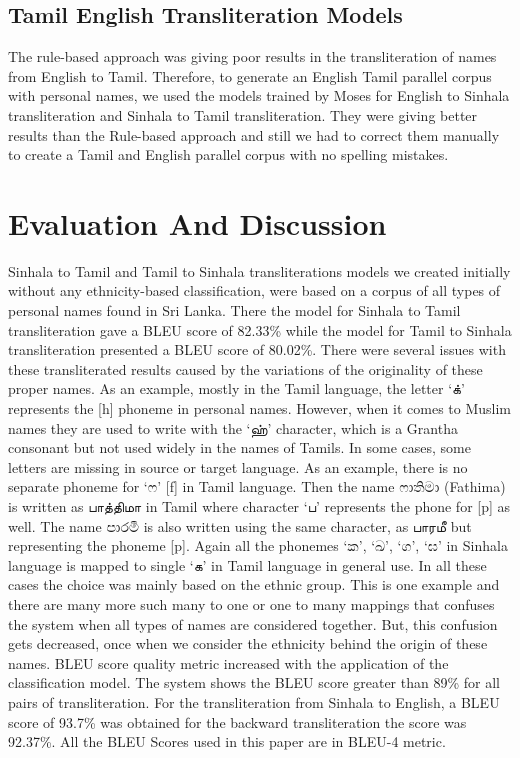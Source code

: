 \documentclass[10pt, a4paper, conference, compsocconf]{IEEEtran}
\begin{document}
\subsection {Tamil English Transliteration Models}
The rule-based approach was giving poor results in the transliteration of names from English to Tamil. Therefore, to generate an English Tamil parallel corpus with personal names, we used the models trained by Moses for English to Sinhala transliteration and Sinhala to Tamil transliteration. They were giving better results than the Rule-based approach and still we had to correct them manually to create a Tamil and English parallel corpus with no spelling mistakes.

\section{Evaluation And Discussion }

 Sinhala to Tamil and Tamil to Sinhala transliterations models we created initially without any ethnicity-based classification, were based on a corpus of all types of personal names found in Sri Lanka. There the model for Sinhala to Tamil transliteration gave a BLEU score of 82.33\% while the model for Tamil to Sinhala transliteration presented a BLEU score of 80.02\%.  
There were several issues with these transliterated results caused by the variations of the originality of these proper names. As an example, mostly in the Tamil language, the letter ‘{\tam க்}’ represents the [h] phoneme in personal names. However, when it comes to Muslim names they are used to write with the ‘{\tam ஹ்}’ character, which is a Grantha consonant  but not used widely in the names of Tamils. In some cases, some letters are missing in source or target language. As an example, there is no separate phoneme for ‘{\sifont ෆ}’ [f] in Tamil language. Then the name {\sifont ෆාතිමා} (Fathima) is written as {\tam பாத்திமா} in Tamil where character ‘{\tam ப}’ represents the phone for [p] as well. The name {\sifont පාරමී } is also written using the same character, as {\tam பாரமீ} but representing the phoneme [p]. Again all the phonemes  ‘{\sifont ක}’, ‘{\sifont ඛ}’, ‘{\sifont ග}’, ‘{\sifont ඝ}’ in Sinhala language is mapped to single ‘{\tam க}’ in Tamil language in general use. In all these cases the choice was mainly based on the ethnic group. This is one example and there are many more such many to one or one to many mappings that confuses the system when all types of names are considered together. But, this confusion gets decreased, once when we consider the ethnicity behind the origin of these names.  
BLEU score quality metric increased with the application of the classification model.  The system shows the BLEU score greater than 89\% for all pairs of transliteration. For the transliteration from Sinhala to English, a BLEU score of 93.7\% was obtained for the backward transliteration the score was 92.37\%. All the BLEU Scores used in this paper are in BLEU-4 metric.
\end{document}
